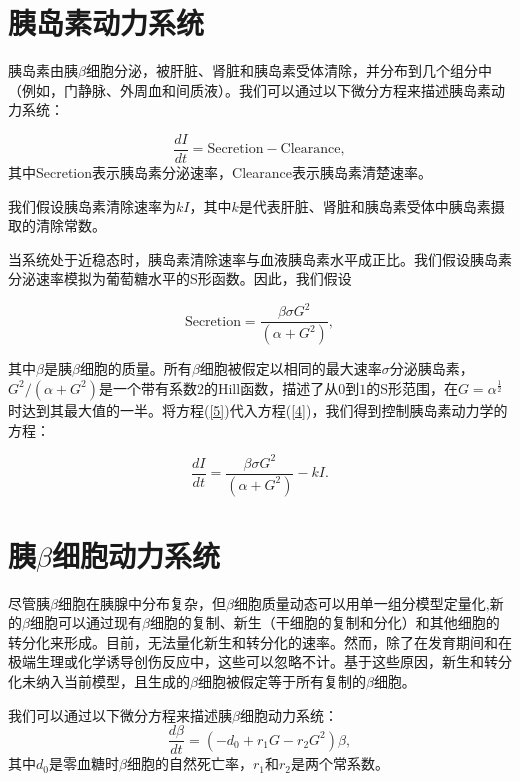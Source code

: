 \section{胰岛素动力系统}
胰岛素由胰$\beta$细胞分泌，被肝脏、肾脏和胰岛素受体清除，并分布到几个组分中（例如，门静脉、外周血和间质液）。我们可以通过以下微分方程来描述胰岛素动力系统：

\begin{equation}\label{4}
    \frac{dI}{dt} = \text{Secretion} - \text{Clearance},
\end{equation}
其中Secretion表示胰岛素分泌速率，Clearance表示胰岛素清楚速率。

我们假设胰岛素清除速率为\(kI\)，其中$k$是代表肝脏、肾脏和胰岛素受体中胰岛素摄取的清除常数。

当系统处于近稳态时，胰岛素清除速率与血液胰岛素水平成正比。我们假设胰岛素分泌速率模拟为葡萄糖水平的S形函数\cite{topp2000model}。因此，我们假设

\begin{equation}\label{5}
    \text{Secretion} = \frac{\beta\sigma G^2}{(\alpha + G^2)},
\end{equation}

其中$\beta$是胰$\beta$细胞的质量。所有$\beta$细胞被假定以相同的最大速率$\sigma$分泌胰岛素，\(G^2/(\alpha + G^2)\)是一个带有系数$2$的Hill函数，描述了从$0$到$1$的S形范围，在$G=\alpha^{\frac{1}{2}}$时达到其最大值的一半。将方程(\ref{5})代入方程(\ref{4})，我们得到控制胰岛素动力学的方程：

\begin{equation}
    \frac{dI}{dt} = \frac{\beta\sigma G^2}{(\alpha + G^2)} - kI.
\end{equation}

\section{胰\(\beta\)细胞动力系统}
尽管胰$\beta$细胞在胰腺中分布复杂，但$\beta$细胞质量动态可以用单一组分模型定量化,新的$\beta$细胞可以通过现有$\beta$细胞的复制、新生（干细胞的复制和分化）和其他细胞的转分化来形成。目前，无法量化新生和转分化的速率。然而，除了在发育期间和在极端生理或化学诱导创伤反应中，这些可以忽略不计\cite{finegood1995dynamics}。基于这些原因，新生和转分化未纳入当前模型，且生成的$\beta$细胞被假定等于所有复制的$\beta$细胞。

我们可以通过以下微分方程来描述胰$\beta$细胞动力系统：
\begin{equation}
    \frac{d\beta}{dt} = (-d_0+r_1G-r_2G^2)\beta,
\end{equation}
其中$d_0$是零血糖时$\beta$细胞的自然死亡率，$r_1$和$r_2$是两个常系数\cite{topp2000model}。
